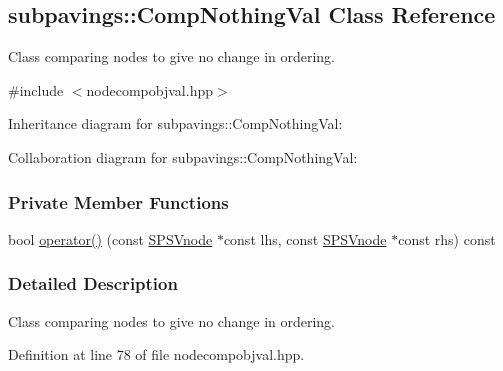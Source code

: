 \hypertarget{classsubpavings_1_1CompNothingVal}{\subsection{subpavings\-:\-:\-Comp\-Nothing\-Val \-Class \-Reference}
\label{classsubpavings_1_1CompNothingVal}
}


\-Class comparing nodes to give no change in ordering.  




{\ttfamily \#include $<$nodecompobjval.\-hpp$>$}



\-Inheritance diagram for subpavings\-:\-:\-Comp\-Nothing\-Val\-:


\-Collaboration diagram for subpavings\-:\-:\-Comp\-Nothing\-Val\-:
\subsubsection*{\-Private \-Member \-Functions}
\begin{DoxyCompactItemize}
\item 
bool \hyperlink{classsubpavings_1_1CompNothingVal_a33f56801a698b37df771a077fddcced4}{operator()} (const \hyperlink{classsubpavings_1_1SPSVnode}{\-S\-P\-S\-Vnode} $\ast$const lhs, const \hyperlink{classsubpavings_1_1SPSVnode}{\-S\-P\-S\-Vnode} $\ast$const rhs) const 
\end{DoxyCompactItemize}


\subsubsection{\-Detailed \-Description}
\-Class comparing nodes to give no change in ordering. 



\-Definition at line 78 of file nodecompobjval.\-hpp.



